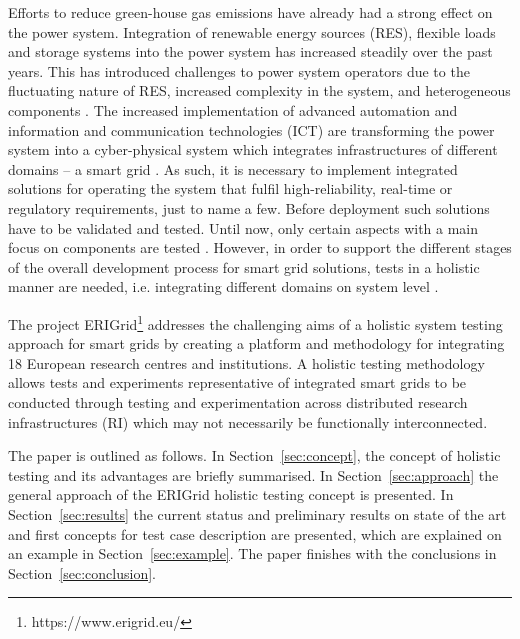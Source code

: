 Efforts to reduce green-house gas emissions have already had a strong effect on the power system. Integration of renewable energy sources (RES), flexible loads and storage systems into the power system has increased steadily over the past years. 
This has introduced challenges to power system operators due to the fluctuating nature of RES, increased complexity in the system, and heterogeneous components \cite{SET}.
The increased implementation of advanced automation and information and communication technologies (ICT) %
are transforming the power system into a cyber-physical system which integrates infrastructures of different domains -- a smart grid \cite{SmartGridsPath, SmartGridsRoadmap}.
As such, it is necessary to implement integrated solutions for operating the system that fulfil high-reliability, real-time or regulatory requirements, just to name a few.
Before deployment such solutions have to be validated and tested.
Until now, only certain aspects with a main focus on components are tested \cite{bruendlinger2015}.
However, in order to support the different stages of the overall development process for smart grid solutions, tests in a holistic manner are needed, i.e. integrating different domains on system level \cite{CIGRE}.

The project ERIGrid\footnote{https://www.erigrid.eu/}
addresses the challenging aims of a holistic system testing approach for smart grids %
by creating a platform and methodology for integrating 18 European research centres and institutions.
%
A holistic testing methodology allows tests and experiments representative of integrated smart grids to be conducted through testing and experimentation across distributed research infrastructures (RI) which may not necessarily be functionally interconnected.

The paper is outlined as follows.
In Section~\ref{sec:concept}, the concept of holistic testing and its advantages are briefly summarised. %
In Section~\ref{sec:approach} the general approach of the ERIGrid holistic testing concept is presented. %
In Section~\ref{sec:results} the current status and preliminary results on state of the art and first concepts for test case description are presented, which are explained on an example in Section~\ref{sec:example}. 
The paper finishes with the conclusions in Section~\ref{sec:conclusion}.